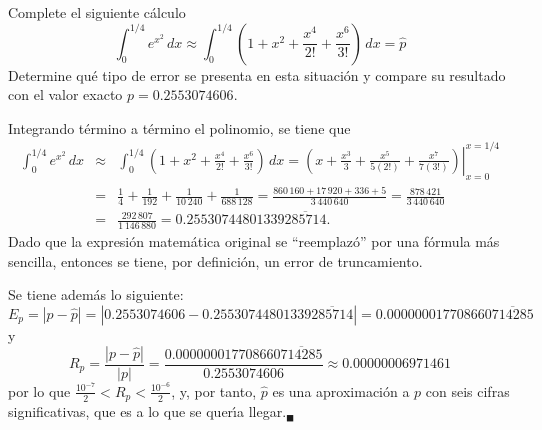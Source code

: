 \begin{enunciado}
 Complete el siguiente c\'alculo
 \begin{equation*}
  \int_{0}^{1/4} e^{x^2} \, dx \approx \int_{0}^{1/4} \left( 1 + x^2 + \frac{x^4}{2!} + \frac{x^6}{3!} \right) \, dx = \widehat{p}
 \end{equation*}
 Determine qu\'e tipo de error se presenta en esta situaci\'on y compare su resultado con el valor exacto $p = 0.2553074606$.
\end{enunciado}

\begin{solucion}
 Integrando t\'ermino a t\'ermino el polinomio, se tiene que
 \begin{eqnarray*}
  \int_{0}^{1/4} e^{x^2} \, dx & \approx & \int_{0}^{1/4} \left( 1 + x^2 + \frac{x^4}{2!} + \frac{x^6}{3!} \right) \, dx = \left.\left( x + \frac{x^3}{3} + \frac{x^5}{5\left(2!\right)} + \frac{x^7}{7\left(3!\right)} \right) \right|_{x=0}^{x=1/4} \\
  & = & \frac{1}{4} + \frac{1}{192} + \frac{1}{10\,240} + \frac{1}{688\,128} = \frac{860\,160 + 17\,920 + 336 + 5}{3\,440\,640} = \frac{878\,421}{3\,440\,640} \\
  & = & \frac{292\,807}{1\,146\,880} = 0.25530744801339\overline{285714}.
 \end{eqnarray*}
 Dado que la expresi\'on matem\'atica original se ``reemplaz\'o'' por una f\'ormula m\'as sencilla, entonces se tiene, por definici\'on, un error de truncamiento.
 \par 
 Se tiene adem\'as lo siguiente:
 \begin{equation*}
  E_p = \left| p - \widehat{p} \right| = |0.2553074606 - 0.25530744801339\overline{285714}| = 0.000000017708660\overline{714285}
 \end{equation*}
 y
 \begin{equation*}
  R_p = \frac{\left| p - \widehat{p} \right|}{|p|} = \frac{0.000000017708660\overline{714285}}{0.2553074606} \approx 0.00000006971461
 \end{equation*}
 por lo que $\frac{10^{-7}}{2} < R_p < \frac{10^{-6}}{2}$, y, por tanto, $\widehat{p}$ es una aproximaci\'on a $p$ con seis cifras significativas, que es a lo que se quer\'{\i}a llegar.${}_{\blacksquare}$
\end{solucion}
